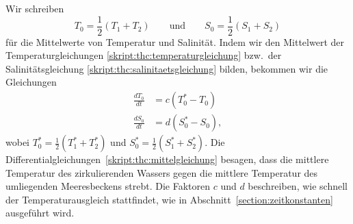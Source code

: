 Wir schreiben
\[
T_0
=
\frac12(T_1+T_2)
\qquad\text{und}\qquad
S_0
=
\frac12(S_1+S_2)
\]
für die Mittelwerte von Temperatur und Salinität.
Indem wir den Mittelwert der Temperaturgleichungen
\eqref{skript:thc:temperaturgleichung}
bzw.~der Salinitätsgleichung \eqref{skript:thc:salinitaetsgleichung} bilden,
bekommen wir die Gleichungen
\begin{equation}
\begin{aligned}
\frac{dT_0}{dt}
&=
c(T_0^*-T_0)
\\
\frac{dS_0}{dt}
&=
d(S_0^*-S_0),
\end{aligned}
\label{skript:thc:mittelgleichung}
\end{equation}
wobei $T_0^* = \frac12(T_1^*+T_2^*)$ und $S_0^* = \frac12(S_1^*+S_2^*)$.
Die Differentialgleichungen~\eqref{skript:thc:mittelgleichung} 
besagen, dass die mittlere Temperatur des zirkulierenden Wassers
gegen die mittlere Temperatur des umliegenden Meeresbeckens strebt.
Die Faktoren $c$ und $d$ beschreiben, wie schnell der Temperaturausgleich
stattfindet, wie in Abschnitt~\ref{section:zeitkonstanten} ausgeführt wird.

